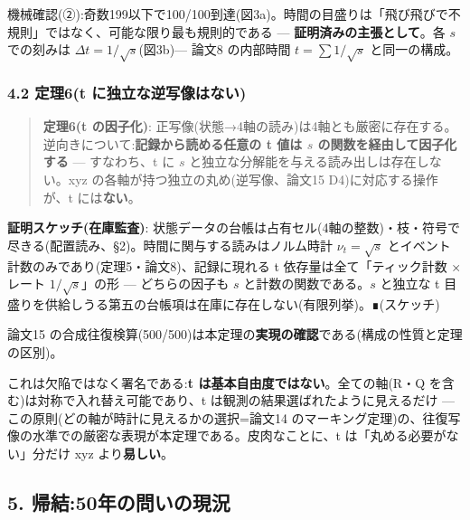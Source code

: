 \documentclass[
]{ltjsarticle}
\begin{document}
機械確認(②):奇数199以下で100/100到達(図3a)。時間の目盛りは「飛び飛びで不規則」ではなく、可能な限り最も規則的である
--- \textbf{証明済みの主張として}。各 \(s\) での刻みは
\(\Delta t=1/\sqrt{s}\)(図3b)--- 論文8 の内部時間 \(t=\sum 1/\sqrt{s}\)
と同一の構成。

\subsubsection{4.2 定理6(t
に独立な逆写像はない)}\label{ux5b9aux74066t-ux306bux72ecux7acbux306aux9006ux5199ux50cfux306fux306aux3044}

\begin{quote}
\textbf{定理6(t の因子化)}:
正写像(状態→4軸の読み)は4軸とも厳密に存在する。逆向きについて:\textbf{記録から読める任意の
t 値は \(s\) の関数を経由して因子化する} --- すなわち、t に \(s\)
と独立な分解能を与える読み出しは存在しない。xyz
の各軸が持つ独立の丸め(逆写像、論文15 D4)に対応する操作が、t
には\textbf{ない}。
\end{quote}

\textbf{証明スケッチ(在庫監査)}:
状態データの台帳は占有セル(4軸の整数)・枝・符号で尽きる(配置読み、§2)。時間に関与する読みはノルム時計
\(\nu_t=\sqrt{s}\) とイベント計数のみであり(定理5・論文8)、記録に現れる
t 依存量は全て「ティック計数 × レート \(1/\sqrt{s}\)」の形 ---
どちらの因子も \(s\) と計数の関数である。\(s\) と独立な t
目盛りを供給しうる第五の台帳項は在庫に存在しない(有限列挙)。∎(スケッチ)

論文15
の合成往復検算(500/500)は本定理の\textbf{実現の確認}である(構成の性質と定理の区別)。

これは欠陥ではなく署名である:\textbf{t
は基本自由度ではない}。全ての軸(R・Q
を含む)は対称で入れ替え可能であり、t
は観測の結果選ばれたように見えるだけ ---
この原則(どの軸が時計に見えるかの選択=論文14
のマーキング定理)の、往復写像の水準での厳密な表現が本定理である。皮肉なことに、t
は「丸める必要がない」分だけ xyz より\textbf{易しい}。

\subsection{5.
帰結:50年の問いの現況}\label{ux5e30ux7d5050ux5e74ux306eux554fux3044ux306eux73feux6cc1}
\end{document}
